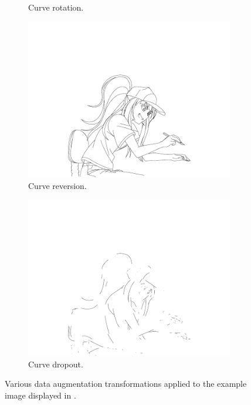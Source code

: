 \begin{figure}
\begin{subfigure}{.24\textwidth}
        \caption{Curve rotation.}
    \end{subfigure}
    \begin{subfigure}{.24\textwidth}
        \includegraphics[width=\textwidth]{graphics/douga/007AD_DOU_27_reverse.pdf}
        \caption{Curve reversion.}
    \end{subfigure}
    \begin{subfigure}{.24\textwidth}
        \includegraphics[width=\textwidth]{graphics/douga/007AD_DOU_27_dropout.pdf}
        \caption{Curve dropout.}
    \end{subfigure}%
    \caption{Various data augmentation transformations applied to the example image displayed in .}
    \label{fig:dataaug}
\end{figure}

